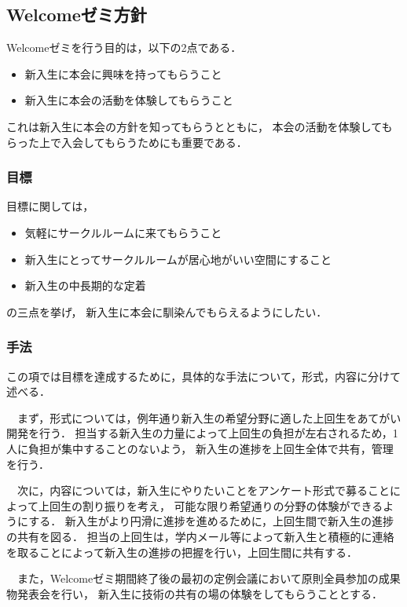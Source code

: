 \subsection*{Welcomeゼミ方針}


Welcomeゼミを行う目的は，以下の2点である．

\begin{itemize}
    \item 新入生に本会に興味を持ってもらうこと
    \item 新入生に本会の活動を体験してもらうこと
\end{itemize}
これは新入生に本会の方針を知ってもらうとともに，
本会の活動を体験してもらった上で入会してもらうためにも重要である．

\subsubsection*{目標}
目標に関しては，
\begin{itemize}
    \item 気軽にサークルルームに来てもらうこと
    \item 新入生にとってサークルルームが居心地がいい空間にすること
    \item 新入生の中長期的な定着
\end{itemize}
の三点を挙げ，
新入生に本会に馴染んでもらえるようにしたい．

\subsubsection*{手法}
この項では目標を達成するために，具体的な手法について，形式，内容に分けて述べる．

　まず，形式については，例年通り新入生の希望分野に適した上回生をあてがい開発を行う．
担当する新入生の力量によって上回生の負担が左右されるため，1人に負担が集中することのないよう，
新入生の進捗を上回生全体で共有，管理を行う．

　次に，内容については，新入生にやりたいことをアンケート形式で募ることによって上回生の割り振りを考え，
可能な限り希望通りの分野の体験ができるようにする．
新入生がより円滑に進捗を進めるために，上回生間で新入生の進捗の共有を図る．
担当の上回生は，学内メール等によって新入生と積極的に連絡を取ることによって新入生の進捗の把握を行い，上回生間に共有する．

　また，Welcomeゼミ期間終了後の最初の定例会議において原則全員参加の成果物発表会を行い，
新入生に技術の共有の場の体験をしてもらうこととする．

